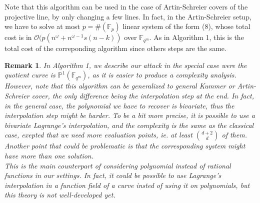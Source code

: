 \documentclass[10pt]{article}
\newtheorem{rq1}{Remark}[]
\newcommand{\s}{\vspace{0.3cm}}
\newcommand{\calO}{\mathcal{O}}
\newcommand{\fqm}{\mathbb{F}_{q^m}}
\newcommand{\w}{\omega}
\begin{document}
\s

Note that this algorithm can be used in the case of Artin-Schreier covers of the projective line, by only changing a few lines. In fact, in the Artin-Schreier setup, we have to solve at most $p = \#(\mathbb{F}_p)$ linear system of the form (8), whose total cost is in $\calO(p(n^{\w}+n^{\w-1}s(n-k))$ over $\fqm$. As in Algorithm 1, this is the total cost of the correponding algorithm since others steps are the same.

\s

\begin{rq1} \rm \color{black}
In Algorithm 1, we describe our attack in the special case were the quotient curve is $\mathbb{P}^1(\fqm)$, as it is easier to produce a complexity analysis. However, note that this algorithm can be generalized to general Kummer or Artin-Schreier cover, the only difference being the interpolation step at the end. In fact, in the general case, the polynomial we have to recover is bivariate, thus the interpolation step might be harder. To be a bit more precise, it is possible to use a bivariate Lagrange's interpolation, and the complexity is the same as the classical case, exepted that we need more evaluation points, ie. at least $\binom{d+2}{d}$ of them. Another point that could be problematic is that the corresponding system might have more than one solution. \\
This is the main counterpart of considering polynomial instead of rational functions in our settings. In fact, it could be possible to use Lagrange's interpolation in a function field of a curve insted of using it on polynomials, but this theory is not well-developed yet.
\end{rq1}
\end{document}
